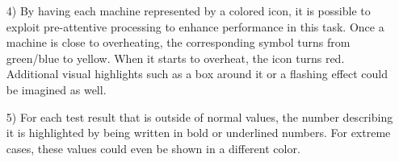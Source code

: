 \documentclass[a4paper]{article}
\begin{document}
\begin{enumerate}
	\item[4)]
	By having each machine represented by a colored icon, it is possible to exploit pre-attentive processing to enhance performance in this task. Once a machine is close to overheating, the corresponding symbol turns from green/blue to yellow. When it starts to overheat, the icon turns red. Additional visual highlights such as a box around it or a flashing effect could be imagined as well.
	
	\item[5)]
	For each test result that is outside of normal values, the number describing it is highlighted by being written in bold or underlined numbers. For extreme cases, these values could even be shown in a different color.
	
\end{enumerate}

	
\end{document}

